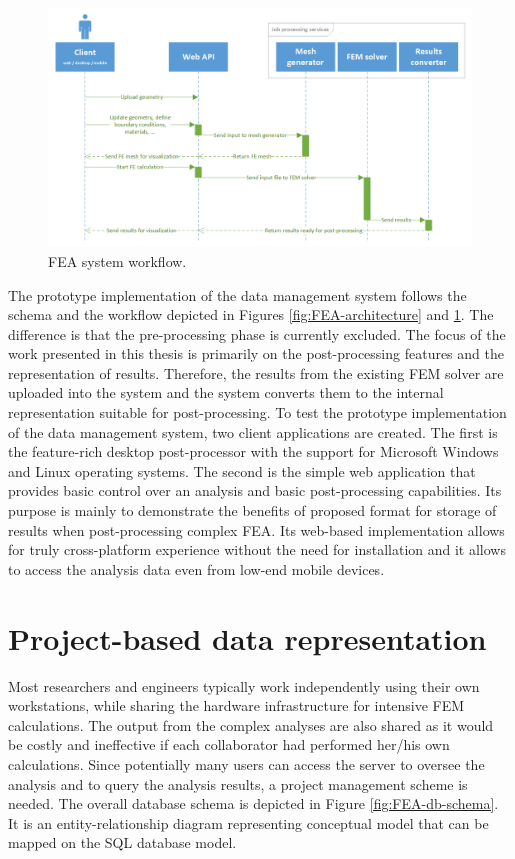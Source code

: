 \begin{figure}[H]
    \centering
    \includegraphics[width=\textwidth]{figures/chapter-data-management/FEA-workflow}
    \decoRule
    \caption{FEA system workflow.}
    \label{fig:FEA-workflow}
\end{figure}

The prototype implementation of the data management system follows the schema and the workflow depicted in Figures \ref{fig:FEA-architecture} and \ref{fig:FEA-workflow}. The difference is that the pre-processing phase is currently excluded. The focus of the work presented in this thesis is primarily on the post-processing features and the representation of results. Therefore, the results from the existing FEM solver are uploaded into the system and the system converts them to the internal representation suitable for post-processing. To test the prototype implementation of the data management system, two client applications are created. The first is the feature-rich desktop post-processor with the support for Microsoft Windows and Linux operating systems. The second is the simple web application that provides basic control over an analysis and basic post-processing capabilities. Its purpose is mainly to demonstrate the benefits of proposed format for storage of results when post-processing complex FEA. Its web-based implementation allows for truly cross-platform experience without the need for installation and it allows to access the analysis data even from low-end mobile devices.

\section{Project-based data representation}
\label{sec:project-db-schema}

Most researchers and engineers typically work independently using their own workstations, while sharing the hardware infrastructure for intensive FEM calculations. The output from the complex analyses are also shared as it would be costly and ineffective if each collaborator had performed her/his own calculations. Since potentially many users can access the server to oversee the analysis and to query the analysis results, a project management scheme is needed. The overall database schema is depicted in Figure \ref{fig:FEA-db-schema}. It is an entity-relationship diagram representing conceptual model that can be mapped on the SQL database model.

